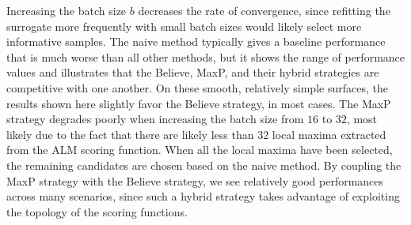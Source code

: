 Increasing the batch size $b$ decreases the rate of convergence, since refitting the surrogate more frequently with small batch sizes would likely select more informative samples.
%
The naive method typically gives a baseline performance that is much worse than all other methods, but it shows the range of performance values and illustrates that the Believe, MaxP, and their hybrid strategies are competitive with one another.
%
On these smooth, relatively simple surfaces, the results shown here slightly favor the Believe strategy, in most cases.
%
The MaxP strategy degrades poorly when increasing the batch size from $16$ to $32$, most likely due to the fact that there are likely less than $32$ local maxima extracted from the ALM scoring function.
%
When all the local maxima have been selected, the remaining candidates are chosen based on the naive method.
%
By coupling the MaxP strategy with the Believe strategy, we see relatively good performances across many scenarios, since such a hybrid strategy takes advantage of exploiting the topology of the scoring functions.

